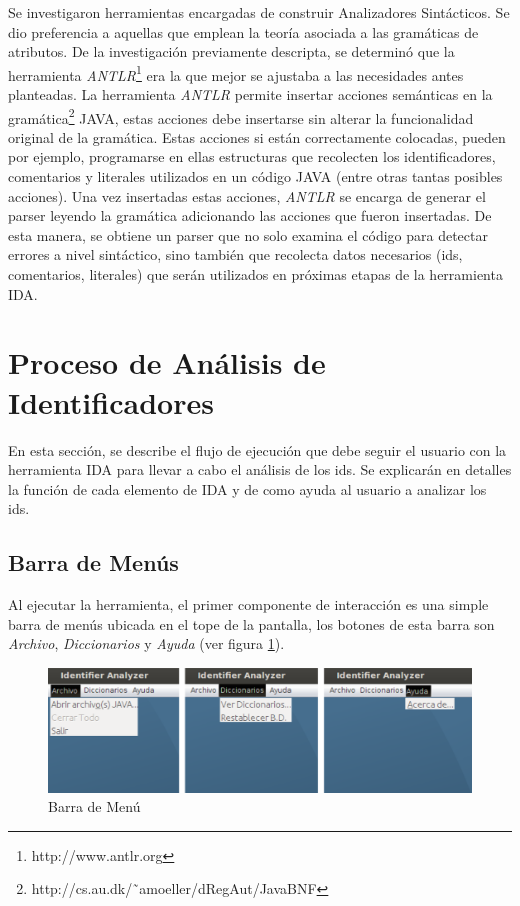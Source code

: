 \documentclass[a4paper,12pt]{report}
\begin{document}
Se investigaron herramientas encargadas de construir Analizadores Sintácticos. Se dio preferencia a aquellas que emplean la teoría asociada a las gramáticas de atributos. De la investigación previamente descripta, se determinó que la herramienta \textit{ANTLR}\footnote[1]{http://www.antlr.org} era la que mejor se ajustaba a las necesidades antes planteadas. La herramienta \textit{ANTLR} permite insertar acciones semánticas en la gramática\footnote[2]{http://cs.au.dk/˜amoeller/dRegAut/JavaBNF} JAVA, estas acciones debe insertarse sin alterar la funcionalidad original de la gramática. Estas acciones si están correctamente colocadas, pueden por ejemplo, programarse en ellas estructuras que recolecten los identificadores, comentarios y literales utilizados en un código JAVA (entre otras tantas posibles acciones). Una vez insertadas estas acciones, \textit{ANTLR} se encarga de generar el parser leyendo la gramática adicionando las acciones que fueron insertadas. De esta manera, se obtiene un parser que no solo examina el código para detectar errores a nivel sintáctico, sino también que recolecta datos necesarios (ids, comentarios, literales) que serán utilizados en próximas etapas de la herramienta IDA. 
%
 
\section{Proceso de Análisis de Identificadores}

En esta sección, se describe el flujo de ejecución que debe seguir el usuario con la herramienta IDA para llevar a cabo el análisis de los ids. Se explicarán en detalles la función de cada elemento de IDA y de como ayuda al usuario a analizar los ids.

\subsection{Barra de Menús}

Al ejecutar la herramienta, el primer componente de interacción es una simple barra de menús ubicada en el tope de la pantalla, los botones de esta barra son \textit{Archivo}, \textit{Diccionarios} y \textit{Ayuda} (ver figura \ref{ida1}). 

\begin{figure}[h] %
\centerline{%
\includegraphics[scale= 0.50]{./ida_01.png}
}
\caption{Barra de Menú}
\label{ida1}
\end{figure}
\end{document}
